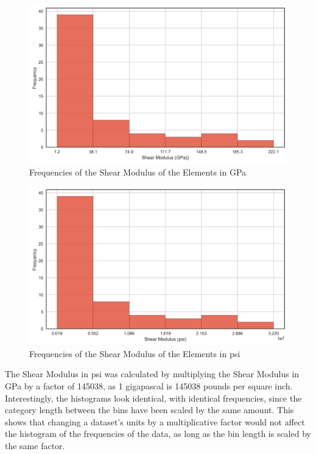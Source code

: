 \documentclass[12pt, titlepage]{article}
\begin{document}
\begin{figure}
\caption{Frequencies of the Shear Modulus of the Elements in GPa \cite{elements}}
\centering
\includegraphics[width=\textwidth*3/4]{assets/elements_histogram.png}
\end{figure}
\begin{figure}
\caption{Frequencies of the Shear Modulus of the Elements in psi \cite{elements}}
\centering
\includegraphics[width=\textwidth*3/4]{assets/elements_histogram_psi.png}
\end{figure}
The Shear Modulus in psi was calculated by multiplying the Shear Modulus in GPa by a factor of 145038, as 1 gigapascal is 145038 pounds per square inch. Interestingly, the histograms look identical, with identical frequencies, since the category length between the bins have been scaled by the same amount. This shows that changing a dataset’s units by a multiplicative factor would not affect the histogram of the frequencies of the data, as long as the bin length is scaled by the same factor.\\
\end{document}
